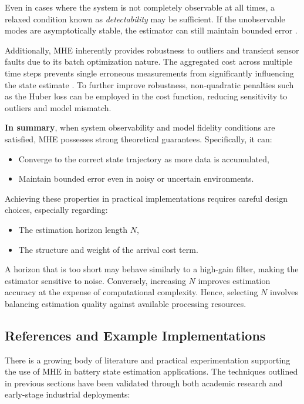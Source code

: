 Even in cases where the system is not completely observable at all times, a relaxed condition known as \textit{detectability} may be sufficient. If the unobservable modes are asymptotically stable, the estimator can still maintain bounded error \cite{Schiller_2024}.

Additionally, MHE inherently provides robustness to outliers and transient sensor faults due to its batch optimization nature. The aggregated cost across multiple time steps prevents single erroneous measurements from significantly influencing the state estimate \cite{Schiller_2023}. To further improve robustness, non-quadratic penalties such as the Huber loss can be employed in the cost function, reducing sensitivity to outliers and model mismatch.

\textbf{In summary}, when system observability and model fidelity conditions are satisfied, MHE possesses strong theoretical guarantees. Specifically, it can:
\begin{itemize}
    \item Converge to the correct state trajectory as more data is accumulated,
    \item Maintain bounded error even in noisy or uncertain environments.
\end{itemize}

Achieving these properties in practical implementations requires careful design choices, especially regarding:
\begin{itemize}
    \item The estimation horizon length $N$,
    \item The structure and weight of the arrival cost term.
\end{itemize}

A horizon that is too short may behave similarly to a high-gain filter, making the estimator sensitive to noise. Conversely, increasing $N$ improves estimation accuracy at the expense of computational complexity. Hence, selecting $N$ involves balancing estimation quality against available processing resources.


\subsection{References and Example Implementations}

There is a growing body of literature and practical experimentation supporting the use of MHE in battery state estimation applications. The techniques outlined in previous sections have been validated through both academic research and early-stage industrial deployments:


